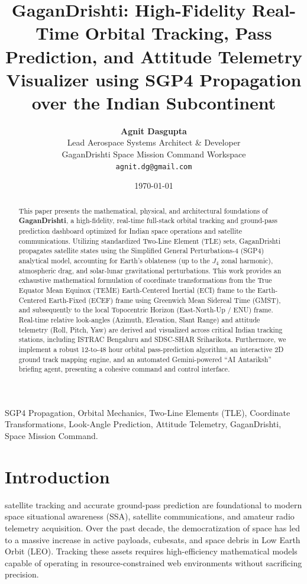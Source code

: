\documentclass[11pt,journal,onecolumn]{IEEEtran}
\title{\textbf{GaganDrishti: High-Fidelity Real-Time Orbital Tracking, Pass Prediction, and Attitude Telemetry Visualizer using SGP4 Propagation over the Indian Subcontinent}}
\author{
    \textbf{Agnit Dasgupta}\\
    \small{Lead Aerospace Systems Architect \& Developer}\\
    \small{GaganDrishti Space Mission Command Workspace}\\
    \small{\texttt{agnit.dg@gmail.com}}
}
\date{\today}
\begin{document}
\maketitle

\begin{abstract}
This paper presents the mathematical, physical, and architectural foundations of \textbf{GaganDrishti}, a high-fidelity, real-time full-stack orbital tracking and ground-pass prediction dashboard optimized for Indian space operations and satellite communications. Utilizing standardized Two-Line Element (TLE) sets, GaganDrishti propagates satellite states using the Simplified General Perturbations-4 (SGP4) analytical model, accounting for Earth's oblateness (up to the $J_4$ zonal harmonic), atmospheric drag, and solar-lunar gravitational perturbations. This work provides an exhaustive mathematical formulation of coordinate transformations from the True Equator Mean Equinox (TEME) Earth-Centered Inertial (ECI) frame to the Earth-Centered Earth-Fixed (ECEF) frame using Greenwich Mean Sidereal Time (GMST), and subsequently to the local Topocentric Horizon (East-North-Up / ENU) frame. Real-time relative look-angles (Azimuth, Elevation, Slant Range) and attitude telemetry (Roll, Pitch, Yaw) are derived and visualized across critical Indian tracking stations, including ISTRAC Bengaluru and SDSC-SHAR Sriharikota. Furthermore, we implement a robust 12-to-48 hour orbital pass-prediction algorithm, an interactive 2D ground track mapping engine, and an automated Gemini-powered ``AI Antariksh'' briefing agent, presenting a cohesive command and control interface.
\end{abstract}

\begin{IEEEkeywords}
SGP4 Propagation, Orbital Mechanics, Two-Line Elements (TLE), Coordinate Transformations, Look-Angle Prediction, Attitude Telemetry, GaganDrishti, Space Mission Command.
\end{IEEEkeywords}

\section{Introduction}
 satellite tracking and accurate ground-pass prediction are foundational to modern space situational awareness (SSA), satellite communications, and amateur radio telemetry acquisition. Over the past decade, the democratization of space has led to a massive increase in active payloads, cubesats, and space debris in Low Earth Orbit (LEO). Tracking these assets requires high-efficiency mathematical models capable of operating in resource-constrained web environments without sacrificing precision.
\end{document}
